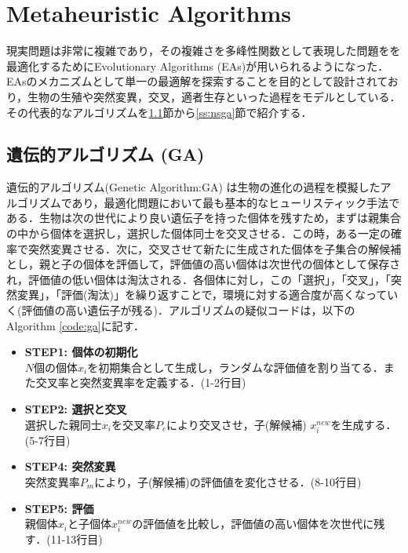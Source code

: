 \documentclass[a4j,11pt]{jarticle}
\begin{document}
\newpage
\section{Metaheuristic Algorithms}

\label{sec:MA}

現実問題は非常に複雑であり，その複雑さを多峰性関数として表現した問題をを最適化するためにEvolutionary Algorithms (EAs)が用いられるようになった．EAsのメカニズムとして単一の最適解を探索することを目的として設計されており，生物の生殖や突然変異，交叉，適者生存といった過程をモデルとしている．その代表的なアルゴリズムを\ref{ss:GA}節から\ref{ss:nsga}節で紹介する．

\subsection{遺伝的アルゴリズム (GA)}
\label{ss:GA}
遺伝的アルゴリズム(Genetic Algorithm:GA) \cite{GA} は生物の進化の過程を模擬したアルゴリズムであり，最適化問題において最も基本的なヒューリスティック手法である．生物は次の世代により良い遺伝子を持った個体を残すため，まずは親集合の中から個体を選択し，選択した個体同士を交叉させる．この時，ある一定の確率で突然変異させる．次に，交叉させて新たに生成された個体を子集合の解候補とし，親と子の個体を評価して，評価値の高い個体は次世代の個体として保存され，評価値の低い個体は淘汰される．各個体に対し，この「選択」，「交叉」，「突然変異」，「評価(淘汰)」を繰り返すことで，環境に対する適合度が高くなっていく(評価値の高い遺伝子が残る)．アルゴリズムの疑似コードは，以下のAlgorithm \ref{code:ga}に記す．

\begin{itemize}
\item {\bf STEP1: 個体の初期化} \\
$N$個の個体$x_i$を初期集合として生成し，ランダムな評価値を割り当てる．また交叉率と突然変異率を定義する．(1-2行目)
\item {\bf STEP2: 選択と交叉} \\
選択した親同士$x_i$を交叉率$P_c$により交叉させ，子(解候補) $x_i^{new}$を生成する．(5-7行目)
\item {\bf STEP4: 突然変異} \\
突然変異率$P_m$により，子(解候補)の評価値を変化させる．(8-10行目)
\item {\bf STEP5: 評価} \\
親個体$x_i$と子個体$x_i^{new}$の評価値を比較し，評価値の高い個体を次世代に残す．(11-13行目)
\end{itemize}
\end{document}

